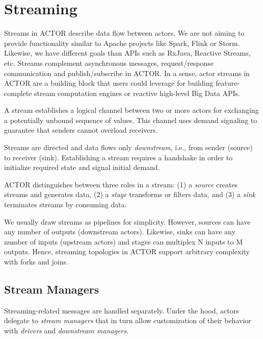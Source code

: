 \section{Streaming\experimental}
\label{streaming}

Streams in ACTOR describe data flow between actors. We are not aiming to provide
functionality similar to Apache projects like Spark, Flink or Storm. Likewise,
we have different goals than APIs such as RxJava, Reactive Streams, etc.
Streams complement asynchronous messages, request/response communication and
publish/subscribe in ACTOR. In a sense, actor streams in ACTOR are a building
block that users could leverage for building feature-complete stream
computation engines or reactive high-level Big Data APIs.

A stream establishes a logical channel between two or more actors for
exchanging a potentially unbound sequence of values. This channel uses demand
signaling to guarantee that senders cannot overload receivers.


Streams are directed and data flows only \emph{downstream}, i.e., from sender
(source) to receiver (sink). Establishing a stream requires a handshake in
order to initialize required state and signal initial demand.


ACTOR distinguishes between three roles in a stream: (1) a \emph{source} creates
streams and generates data, (2) a \emph{stage} transforms or filters data, and
(3) a \emph{sink} terminates streams by consuming data.

We usually draw streams as pipelines for simplicity. However, sources can have
any number of outputs (downstream actors). Likewise, sinks can have any number
of inputs (upstream actors) and stages can multiplex N inputs to M outputs.
Hence, streaming topologies in ACTOR support arbitrary complexity with forks and
joins.

\subsection{Stream Managers}

Streaming-related messages are handled separately. Under the hood, actors
delegate to \emph{stream managers} that in turn allow customization of their
behavior with \emph{drivers} and \emph{downstream managers}.

